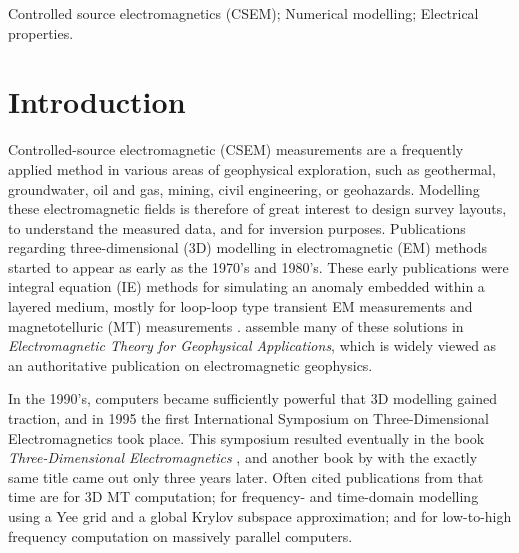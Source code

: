 \documentclass[onecolumn,extra,camera]{gji}
\begin{document}
\begin{keywords}
  Controlled source electromagnetics (CSEM); Numerical modelling; Electrical properties.
\end{keywords}


\section{Introduction}

Controlled-source electromagnetic (CSEM) measurements are a frequently applied method in various areas of geophysical exploration, such as geothermal, groundwater, oil and gas, mining, civil engineering, or geohazards. Modelling these electromagnetic fields is therefore of great interest to design survey layouts, to understand the measured data, and for inversion purposes. Publications regarding three-dimensional (3D) modelling in electromagnetic (EM) methods started to appear as early as the 1970's and 1980's. These early publications were integral equation (IE) methods for simulating an anomaly embedded within a layered medium, mostly for loop-loop type transient EM measurements  \citep{GJI.74.Raiche, GEO.75.Hohmann, GJI.82.Das, GEO.86.Newman} and magnetotelluric (MT) measurements \citep{GEO.84.Wannamaker}. \cite{B.SEG.88.Ward} assemble many of these solutions in \emph{Electromagnetic Theory for Geophysical Applications}, which is widely viewed as an authoritative publication on electromagnetic geophysics.

In the 1990's, computers became sufficiently powerful that 3D modelling gained traction, and in 1995 the first International Symposium on Three-Dimensional Electromagnetics took place. This symposium resulted eventually in the book \emph{Three-Dimensional Electromagnetics} \citep{B.SEG.99.Oristaglio}, and another book by \cite{B.02.Wannamaker} with the exactly same title came out only three years later. Often cited publications from that time are \cite{RSC.94.Mackie} for 3D MT computation; \cite{RS.94.Druskin} for frequency- and time-domain modelling using a Yee grid and a global Krylov subspace approximation; and \cite{RS.96.Alumbaugh, GJI.97.Newman} for low-to-high frequency computation on massively parallel computers.
\end{document}
